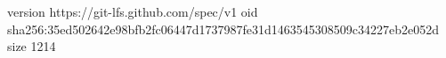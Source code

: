 version https://git-lfs.github.com/spec/v1
oid sha256:35ed502642e98bfb2fc06447d1737987fe31d1463545308509c34227eb2e052d
size 1214
